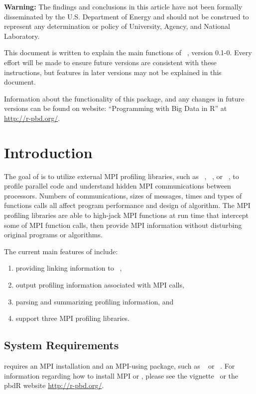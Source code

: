 {\color{red} \bf Warning:}
The findings and conclusions in this article have not been
formally disseminated by the U.S. Department of Energy
and should not be construed to represent any determination or
policy of University, Agency, and National Laboratory.

This document is written to explain the main
functions of ~\citep{Sehrawat2013pbdPROFpackage}, version 0.1-0.
Every effort will be made to ensure future versions are consistent with
these instructions, but features in later versions may not be explained
in this document.

Information about the functionality of this package,
and any changes in future versions can be found on website:
``Programming with Big Data in R'' at
\url{http://r-pbd.org/}.



\section{Introduction}
\label{sec:introduction}

The goal of  is to utilize external MPI profiling libraries,
such as ~\citep{fpmpi}, ~\citep{mpiP}, or
~\citep{TAU},
to profile parallel  code and understand hidden MPI
communications between processors. Numbers of communications,
sizes of messages, times and types of functions calls all affect program
performance and design of algorithm. The MPI profiling libraries are able to
high-jack MPI functions at run time that intercept some of MPI function calls,
then provide MPI information without disturbing original programs or algorithms.

The current main features of  include:
\begin{enumerate}
\item providing linking information to ~\citep{pbdR2012},
\item output profiling information associated with MPI calls,
\item parsing and summarizing profiling information, and
\item support three MPI profiling libraries.
\end{enumerate}


\subsection[System Requirements]{System Requirements}
\label{sec:system_requirements}

 requires an MPI installation and an MPI-using package, such as ~\citep{Chen2012pbdMPIpackage} or
~\citep{Yu2002}.  For information regarding how to install MPI or , please see the  vignette~\citep{Chen2012pbdMPIvignette} or the pbdR website \url{http://r-pbd.org/}.

